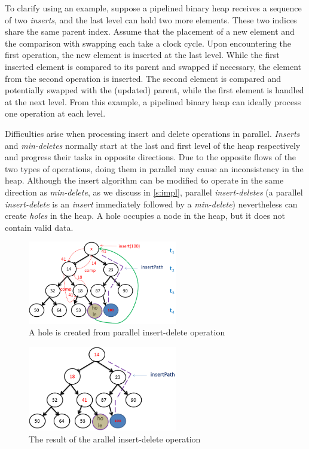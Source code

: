 To clarify using an example, suppose a pipelined binary heap receives a sequence of two {\it inserts}, and the last level can hold two more elements.
These two indices share the same parent index.
Assume that the placement of a new element and the comparison with swapping each take a clock cycle.
Upon encountering the first operation, the new element is inserted at the last level.
While the first inserted element is compared to its parent and swapped if necessary, the element from the second operation is inserted.
The second element is compared and potentially swapped with the (updated) parent, while the first element is handled at the next level.
From this example, a pipelined binary heap can ideally process one operation at each level.

Difficulties arise when processing insert and delete operations in parallel.
{\it Inserts} and {\it min-deletes} normally start at the last and first level of the heap respectively and progress their tasks in opposite directions.
Due to the opposite flows of the two types of operations, doing them in parallel may cause an inconsistency in the heap.
Although the insert algorithm can be modified to operate in the same direction as {\it min-delete}, as we discuss in \autoref{s:impl}, parallel {\it insert-deletes} (a parallel {\it insert-delete} is an {\it insert} immediately followed by a {\it min-delete}) nevertheless can create {\it holes} in the heap. 
A hole occupies a node in the heap, but it does not contain valid data.

\begin{figure}[!ht]
  \centering
  \includegraphics[width=6.5cm]{fig/normal-insert-delete.png}
      \caption{A hole is created from parallel insert-delete operation}
    \label{hole}
\end{figure}

\begin{figure}[!ht]
  \centering
  \includegraphics[width=6.5cm]{fig/normal-insert-delete-2.png}
      \caption{The result of the arallel insert-delete operation}
    \label{hole-after}
\end{figure}

